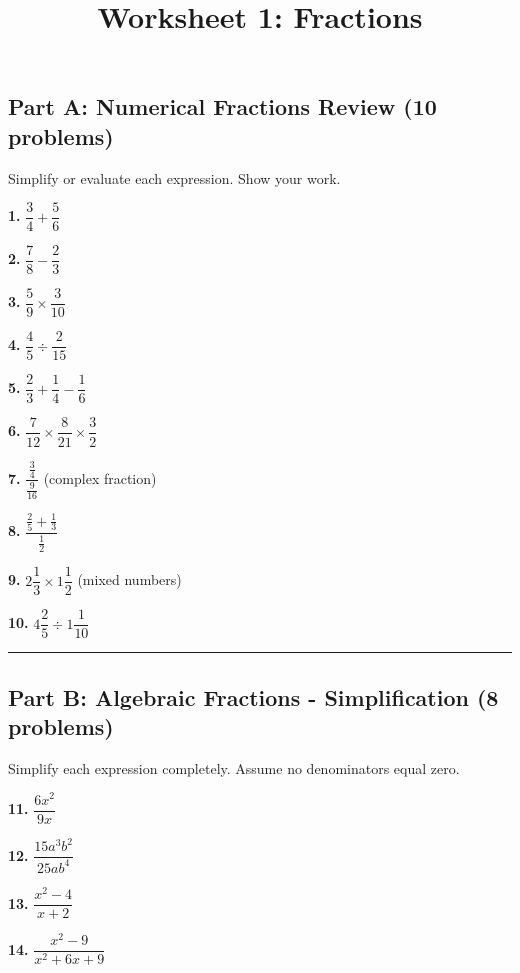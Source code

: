 \documentclass[
  11pt,
]{article}
\title{Worksheet 1: Fractions}
\author{}
\date{}
\begin{document}
\maketitle

\hypertarget{part-a-numerical-fractions-review-10-problems}{%
\subsection{Part A: Numerical Fractions Review (10
problems)}\label{part-a-numerical-fractions-review-10-problems}}

Simplify or evaluate each expression. Show your work.

\textbf{1.} \(\dfrac{3}{4} + \dfrac{5}{6}\)

\textbf{2.} \(\dfrac{7}{8} - \dfrac{2}{3}\)

\textbf{3.} \(\dfrac{5}{9} \times \dfrac{3}{10}\)

\textbf{4.} \(\dfrac{4}{5} \div \dfrac{2}{15}\)

\textbf{5.} \(\dfrac{2}{3} + \dfrac{1}{4} - \dfrac{1}{6}\)

\textbf{6.} \(\dfrac{7}{12} \times \dfrac{8}{21} \times \dfrac{3}{2}\)

\textbf{7.} \(\dfrac{\frac{3}{4}}{\frac{9}{16}}\) (complex fraction)

\textbf{8.} \(\dfrac{\frac{2}{5} + \frac{1}{3}}{\frac{1}{2}}\)

\textbf{9.} \(2\dfrac{1}{3} \times 1\dfrac{1}{2}\) (mixed numbers)

\textbf{10.} \(4\dfrac{2}{5} \div 1\dfrac{1}{10}\)

\begin{center}\rule{0.5\linewidth}{0.5pt}\end{center}

\hypertarget{part-b-algebraic-fractions---simplification-8-problems}{%
\subsection{Part B: Algebraic Fractions - Simplification (8
problems)}\label{part-b-algebraic-fractions---simplification-8-problems}}

Simplify each expression completely. Assume no denominators equal zero.

\textbf{11.} \(\dfrac{6x^2}{9x}\)

\textbf{12.} \(\dfrac{15a^3b^2}{25ab^4}\)

\textbf{13.} \(\dfrac{x^2 - 4}{x + 2}\)

\textbf{14.} \(\dfrac{x^2 - 9}{x^2 + 6x + 9}\)
\end{document}
